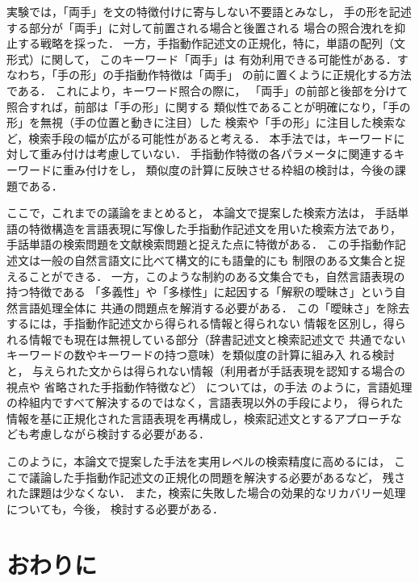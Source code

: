 実験では，「両手」を文の特徴付けに寄与しない不要語とみなし，
手の形を記述する部分が「両手」に対して前置される場合と後置される
場合の照合洩れを抑止する戦略を採った．
一方，手指動作記述文の正規化，特に，単語の配列（文形式）に関して，
このキーワード「両手」は
有効利用できる可能性がある．すなわち，「手の形」の手指動作特徴は「両手」
の前に置くように正規化する方法である．
これにより，キーワード照合の際に，
「両手」の前部と後部を分けて照合すれば，前部は「手の形」に関する
類似性であることが明確になり，「手の形」を無視（手の位置と動きに注目）した
検索や「手の形」に注目した検索など，検索手段の幅が広がる可能性があると考える．
本手法では，キーワードに対して重み付けは考慮していない．
手指動作特徴の各パラメータに関連するキーワードに重み付けをし，
類似度の計算に反映させる枠組の検討は，今後の課題である．

ここで，これまでの議論をまとめると，
本論文で提案した検索方法は，
手話単語の特徴構造を言語表現に写像した手指動作記述文を用いた検索方法であり，
手話単語の検索問題を文献検索問題と捉えた点に特徴がある．
この手指動作記述文は一般の自然言語文に比べて構文的にも語彙的にも
制限のある文集合と捉えることができる．
一方，このような制約のある文集合でも，自然言語表現の持つ特徴である
「多義性」や「多様性」に起因する「解釈の曖昧さ」という自然言語処理全体に
共通の問題点を解消する必要がある．
この「曖昧さ」を除去するには，手指動作記述文から得られる情報と得られない
情報を区別し，得られる情報でも現在は無視している部分（辞書記述文と検索記述文で
共通でないキーワードの数やキーワードの持つ意味）を類似度の計算に組み入
れる検討と，
与えられた文からは得られない情報（利用者が手話表現を認知する場合の視点や
省略された手指動作特徴など）
については，\cite{AdachiHisahiro1998}の手法
のように，言語処理の枠組内ですべて解決するのではなく，言語表現以外の手段により，
得られた情報を基に正規化された言語表現を再構成し，検索記述文とするアプローチな
ども考慮しながら検討する必要がある．

このように，本論文で提案した手法を実用レベルの検索精度に高めるには，
ここで議論した手指動作記述文の正規化の問題を解決する必要があるなど，
残された課題は少なくない．
また，検索に失敗した場合の効果的なリカバリー処理についても，今後，
検討する必要がある．


\section {おわりに}

